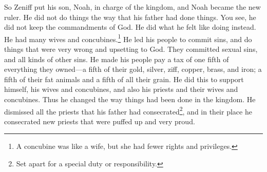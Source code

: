 \bchapter
\bverse \iffalse And now it came to pass that Zeniff conferred the kingdom upon Noah, one of his sons; therefore Noah began to reign in his stead; and he did not walk in the ways of his father. \fi
So Zeniff put his son, Noah, in charge of the kingdom, and Noah became the new ruler. He did not do things the way that his father had done things.
\bverse \iffalse For behold, he did not keep the commandments of God, but he did walk after the desires of his own heart. And he had many wives and concubines. And he did cause his people to commit sin, and do that which was abominable in the sight of the Lord. Yea, and they did commit whoredoms and all manner of wickedness. \fi
You see, he did not keep the commandments of God. He did what he felt like doing instead. He had many wives and concubines.\footnote{A concubine was like a wife, but she had fewer rights and privileges.} He led his people to commit sins, and do things that were very wrong and upsetting to God. They committed sexual sins, and all kinds of other sins.
\bverse \iffalse And he laid a tax of one fifth part of all they possessed, a fifth part of their gold and of their silver, and a fifth part of their ziff, and of their copper, and of their brass and their iron; and a fifth part of their fatlings; and also a fifth part of all their grain. \fi
He made his people pay a tax of one fifth of everything they owned---a fifth of their gold, silver, ziff, copper, brass, and iron; a fifth of their fat animals and a fifth of all their grain.
\bverse \iffalse And all this did he take to support himself, and his wives and his concubines; and also his priests, and their wives and their concubines; thus he had changed the affairs of the kingdom. \fi
He did this to support himself, his wives and concubines, and also his priests and their wives and concubines. Thus he changed the way things had been done in the kingdom.
\bverse \iffalse For he put down all the priests that had been consecrated by his father, and consecrated new ones in their stead, such as were lifted up in the pride of their hearts. \fi
He dismissed all the priests that his father had consecrated\footnote{Set apart for a special duty or responsibility.}, and in their place he consecrated new priests that were puffed up and very proud.
\bverse \iffalse Yea, and thus they were supported in their laziness, and in their idolatry, and in their whoredoms, by the taxes which king Noah had put upon his people; thus did the people labor exceedingly to support iniquity. \fi
